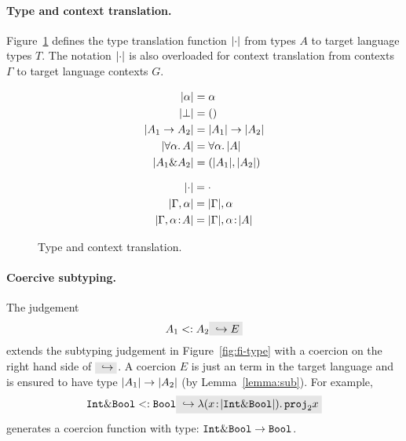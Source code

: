 \paragraph{Type and context translation.}

Figure~\ref{fig:type-and-context-translation} defines the type translation
function $\lvert \cdot \rvert$ from \name types $A$ to target language types $T$. The
notation $\lvert \cdot \rvert$ is also overloaded for context translation from \name
contexts $\Gamma$ to target language contexts $G$.

\begin{figure}[h]

  \begin{align*}
    \lvert \alpha \rvert           &= \alpha \\
    \lvert \bot \rvert             &= () \\
    \lvert A_1 \to A_2 \rvert    &= \lvert A_1 \rvert \to \lvert A_2 \rvert \\
    \lvert \forall \alpha.\, A \rvert  &= \forall \alpha.\, \lvert A \rvert \\
    \lvert A_1 \& A_2 \rvert &= (\lvert A_1 \rvert, \lvert A_2 \rvert) \\
  \end{align*}


  \begin{align*}
    \lvert \cdot \rvert                      &= \cdot \\
    \lvert \Gamma, \alpha \rvert           &= \lvert \Gamma \rvert, \alpha \\
    \lvert \Gamma, \alpha \!:\! A \rvert &= \lvert \Gamma \rvert, \alpha \!:\! \lvert A \rvert
  \end{align*}

  \caption{Type and context translation.}
  \label{fig:type-and-context-translation}
\end{figure}


\paragraph{Coercive subtyping.}

The judgement
\[
A_1 \subtype A_2 \yields E
\]
extends the subtyping judgement in Figure~\ref{fig:fi-type} with a coercion
on the right hand side of $ \yields {} $. A coercion $ E $ is just an term
in the target language and is ensured to have type
$ \lvert A_1 \rvert \to \lvert A_2 \rvert $ (by Lemma~\ref{lemma:sub}). For example,
\[
\tyint \inter \tybool \subtype \tybool \yields {\lamty x {\im {\tyint \inter \tybool}} {\proj 2 x}}
\]
generates a coercion function with type: $\texttt{Int} \& \texttt{Bool} \to \texttt{Bool}$.

